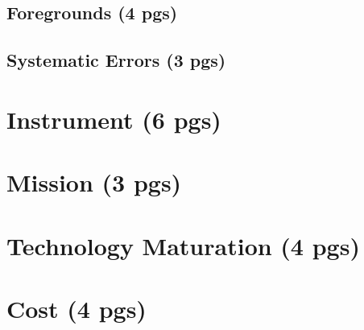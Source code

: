 \documentclass[12pt]{article}
\begin{document}
\subsection{Foregrounds (4 pgs)}


\subsection{Systematic Errors (3 pgs)}


\section{Instrument (6 pgs)}


\section{Mission (3 pgs)}


\section{Technology Maturation (4 pgs)}


\section{Cost (4 pgs)}


\newpage




\end{document}
